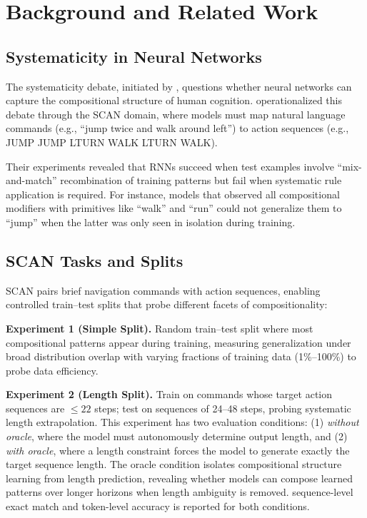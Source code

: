 \documentclass[11pt]{article}
\begin{document}
\section{Background and Related Work}

\subsection{Systematicity in Neural Networks}

The systematicity debate, initiated by \citet{Fodor:88}, questions whether neural networks can capture the compositional structure of human cognition. \citet{lake2018generalizationsystematicitycompositionalskills} operationalized this debate through the SCAN domain, where models must map natural language commands (e.g., ``jump twice and walk around left'') to action sequences (e.g., JUMP JUMP LTURN WALK LTURN WALK).

Their experiments revealed that RNNs succeed when test examples involve ``mix-and-match'' recombination of training patterns but fail when systematic rule application is required. For instance, models that observed all compositional modifiers with primitives like ``walk'' and ``run'' could not generalize them to ``jump'' when the latter was only seen in isolation during training.

\subsection{SCAN Tasks and Splits}

SCAN pairs brief navigation commands with action sequences, enabling controlled train--test splits that probe different facets of compositionality:

\textbf{Experiment 1 (Simple Split).} Random train--test split where most compositional patterns appear during training, measuring generalization under broad distribution overlap with varying fractions of training data (1\%--100\%) to probe data efficiency.

\textbf{Experiment 2 (Length Split).} Train on commands whose target action sequences are $\leq 22$ steps; test on sequences of 24--48 steps, probing systematic length extrapolation. This experiment has two evaluation conditions: (1) \textit{without oracle}, where the model must autonomously determine output length, and (2) \textit{with oracle}, where a length constraint forces the model to generate exactly the target sequence length. The oracle condition isolates compositional structure learning from length prediction, revealing whether models can compose learned patterns over longer horizons when length ambiguity is removed. sequence-level exact match and token-level accuracy is reported for both conditions.
\end{document}
